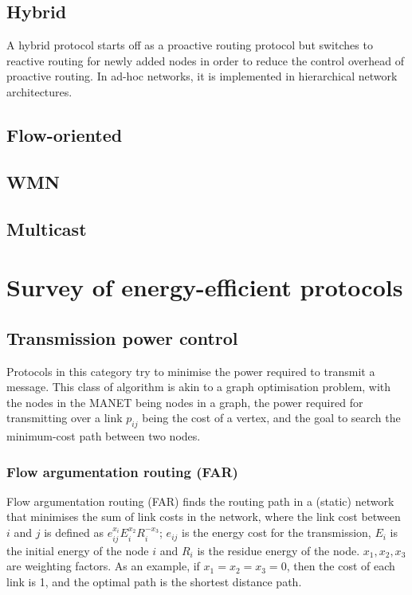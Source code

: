\documentclass[conference]{IEEEtran}
\begin{document}
\subsection{Hybrid}
A hybrid protocol starts off as a proactive routing protocol but switches
to reactive routing for newly added nodes in order to reduce the control
overhead of proactive routing. In ad-hoc networks, it is implemented in
hierarchical network architectures.

\subsection{Flow-oriented}
\subsection{WMN}
\subsection{Multicast}

\section{Survey of energy-efficient protocols}
\subsection{Transmission power control}
Protocols in this category try to minimise the power required to transmit
a message. This class of algorithm is akin to a graph optimisation problem,
with the nodes in the MANET being nodes in a graph, the power required for
transmitting over a link $p_{ij}$ being the cost of a vertex, and the goal
to search the minimum-cost path between two nodes.

\subsubsection{Flow argumentation routing (FAR)}
Flow argumentation routing (FAR)\cite{chang2000energy} finds the routing
path in a (static) network that minimises the sum of link costs in the network,
where the link cost between $i$ and $j$ is defined as \( e_{ij}^{x_{i}}E_{i}^{x_{2}}R_{i}^{-x_{3}}\);
\(e_{ij}\) is the energy cost for the transmission, $E_{i}$ is the initial energy
of the node $i$ and $R_{i}$ is the residue energy of the node. \(x_{1}, x_{2}, x_{3}\)
are weighting factors. As an example, if $x_{1}=x_{2}=x_{3}=0$, then the cost
of each link is 1, and the optimal path is the shortest distance path.
\end{document}
